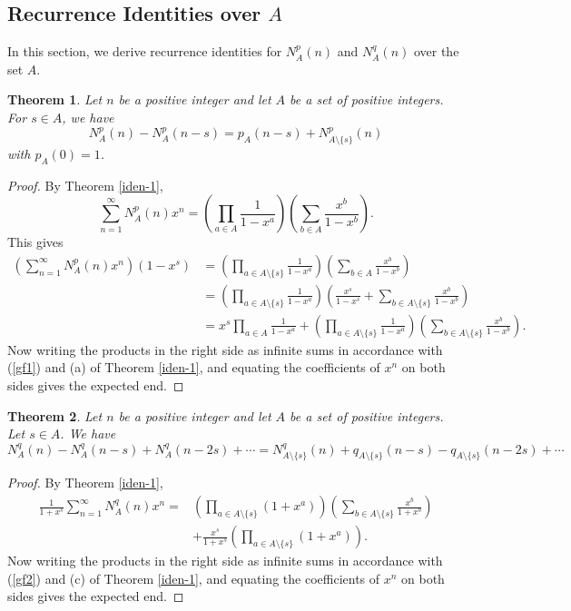 \documentclass[11pt]{article}
\newtheorem{theorem}{Theorem}
\begin{document}
\subsection{ Recurrence Identities over $A$}
In this section, we derive recurrence identities for $N_A^p(n)$ and $N_A^q(n)$ over the set $A$. 
\begin{theorem}\label{roverA}
Let $n$ be a positive integer and let $A$ be a set of positive integers. For $s\in A$, we have
\begin{equation}
N_A^p(n)-N_A^p(n-s)=p_A(n-s)+N_{A\setminus\{s\}}^p(n)
\end{equation}
with $p_A(0)=1$.
\end{theorem}
\begin{proof}
By Theorem \ref{iden-1},
\begin{equation}
\sum_{n=1}^{\infty}N_A^p(n)x^n=\left(\prod_{a\in A}\frac{1}{1-x^a}\right)\left(\sum_{b\in A}\frac{x^b}{1-x^b}\right).
\end{equation}
This gives 
\begin{align*}
\left(\sum_{n=1}^{\infty}N_A^p(n)x^n\right)(1-x^s)&=\left(\prod_{a\in A\setminus\{s\}}\frac{1}{1-x^a}\right)\left(\sum_{b\in A}\frac{x^b}{1-x^b}\right)\\
&=\left(\prod_{a\in A\setminus\{s\}}\frac{1}{1-x^a}\right)\left(\frac{x^s}{1-x^s}+\sum_{b\in A\setminus\{s\}}\frac{x^b}{1-x^b}\right)\\
&=x^s\prod_{a\in A}\frac{1}{1-x^a}+\left(\prod_{a\in A\setminus\{s\}}\frac{1}{1-x^a}\right)\left(\sum_{b\in A\setminus\{s\}}\frac{x^b}{1-x^b}\right).
\end{align*}
Now writing the products in the right side as infinite sums in accordance with (\ref{gf1}) and (a) of Theorem \ref{iden-1}, and equating the coefficients of $x^n$ on both sides gives the expected end. 
\end{proof}
\begin{theorem}
Let $n$ be a positive integer and let $A$ be a set of positive integers. Let $s\in A$. We have
\begin{equation}
N_A^q(n)-N_A^q(n-s)+N_A^q(n-2s)+\cdots =N_{{A\setminus\{s\}}}^q(n)+q_{{A\setminus\{s\}}}(n-s)-q_{{A\setminus\{s\}}}(n-2s)+\cdots 
\end{equation}
\end{theorem}
\begin{proof}
By Theorem \ref{iden-1},
\begin{align*}
\frac{1}{1+x^s}\sum_{n=1}^{\infty}N^q_A(n)x^n=&\left(\prod_{a\in A\setminus\{s\}}(1+x^a)\right)\left(\sum_{b\in A\setminus\{s\}}\frac{x^b}{1+x^b}\right)\\&+\frac{x^s}{1+x^s}\left(\prod_{a\in A\setminus\{s\}}(1+x^a)\right).
\end{align*}
Now writing the products in the right side as infinite sums in accordance with (\ref{gf2}) and (c) of Theorem \ref{iden-1}, and equating the coefficients of $x^n$ on both sides gives the expected end.
\end{proof}
\end{document}
